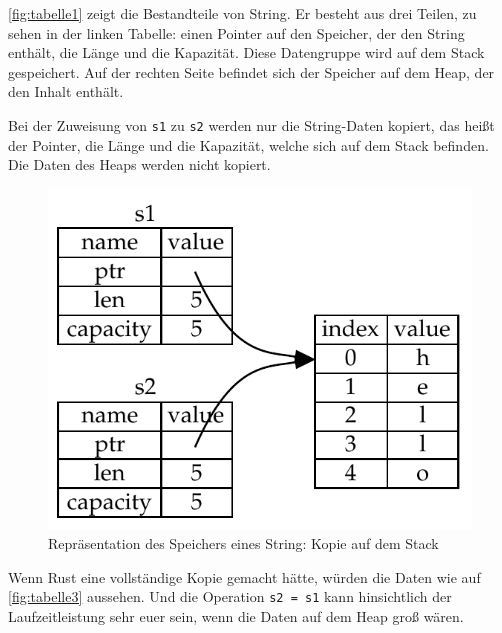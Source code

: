 \autoref{fig:tabelle1} zeigt die Bestandteile von String. Er besteht aus drei Teilen, zu sehen in der linken Tabelle: einen Pointer auf den Speicher, der den String enthält, die Länge und die Kapazität. Diese Datengruppe wird auf dem Stack gespeichert. Auf der rechten Seite befindet sich der Speicher auf dem Heap, der den Inhalt enthält.

Bei der Zuweisung von \verb"s1" zu \verb"s2" werden nur die String-Daten kopiert, das heißt der Pointer, die Länge und die Kapazität, welche sich auf dem Stack befinden. Die Daten des Heaps werden nicht kopiert.

\begin{figure}[htbp]
    \centering
    \includegraphics[scale=0.9]{Programmierung/Tabelle2.pdf}
    \caption{Repräsentation des Speichers eines String: Kopie auf dem Stack}
    \label{fig:tabelle2}
\end{figure}

Wenn Rust eine vollständige Kopie gemacht hätte, würden die Daten wie auf \autoref{fig:tabelle3} aussehen. Und die Operation \verb"s2 = s1" kann hinsichtlich der Lauf\-zeit\-leis\-tung sehr euer sein, wenn die Daten auf dem Heap groß wären.


